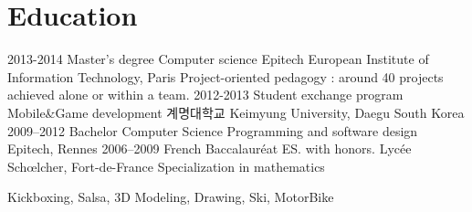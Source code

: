 \documentclass{emonides-cv}
\begin{document}
\section{Education}
\begin{entrylist}
  \entrytwo
    {2013-2014}
    {Master's degree {\normalfont Computer science }}
    {Epitech European Institute of Information Technology, Paris} {Project-oriented pedagogy : around 40 projects achieved alone or within a team.}
  \entrytwo
    {2012-2013}
    {Student exchange program  {\normalfont  Mobile\&Game development }}
    { {\sffamily 계명대학교} Keimyung University, Daegu South Korea} {}
  \entrytwo
    {2009–2012}
    {Bachelor  {\normalfont Computer Science Programming and software design}}
    {Epitech, Rennes} {}
  \entry
    {2006–2009}
    {French Baccalauréat ES. {\normalfont with honors. }}
    {Lycée Schœlcher, Fort-de-France} { Specialization in mathematics }
\end{entrylist}
\normalsize Kickboxing, Salsa, 3D Modeling, Drawing, Ski, MotorBike
\end{document}
